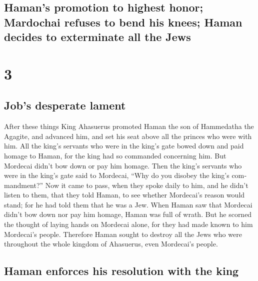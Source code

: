 \begin{paracol}{2}
\switchcolumn
\begin{otherlanguage}{english}

\hypertarget{hamans-promotion-to-highest-honor-mardochai-refuses-to-bend-his-knees-haman-decides-to-exterminate-all-the-jews}{%
\subsection{Haman's promotion to highest honor; Mardochai refuses to
bend his knees; Haman decides to exterminate all the
Jews}\label{hamans-promotion-to-highest-honor-mardochai-refuses-to-bend-his-knees-haman-decides-to-exterminate-all-the-jews}}

\hypertarget{section-5}{%
\section{3}\label{section-5}}

\hypertarget{jobs-desperate-lament}{%
\subsection{Job's desperate lament}\label{jobs-desperate-lament}}

 After these things King Ahasuerus promoted Haman the son
of Hammedatha the Agagite, and advanced him, and set his seat above all
the princes who were with him.  All the king's servants
who were in the king's gate bowed down and paid homage to Haman, for the
king had so commanded concerning him. But Mordecai didn't bow down or
pay him homage.  Then the king's servants who were in the
king's gate said to Mordecai, ``Why do you disobey the king's
commandment?''  Now it came to pass, when they spoke daily
to him, and he didn't listen to them, that they told Haman, to see
whether Mordecai's reason would stand; for he had told them that he was
a Jew.  When Haman saw that Mordecai didn't bow down nor
pay him homage, Haman was full of wrath.  But he scorned
the thought of laying hands on Mordecai alone, for they had made known
to him Mordecai's people. Therefore Haman sought to destroy all the Jews
who were throughout the whole kingdom of Ahasuerus, even Mordecai's
people.

\hypertarget{haman-enforces-his-resolution-with-the-king}{%
\subsection{Haman enforces his resolution with the
king}\label{haman-enforces-his-resolution-with-the-king}}


\end{otherlanguage}
\end{paracol}

